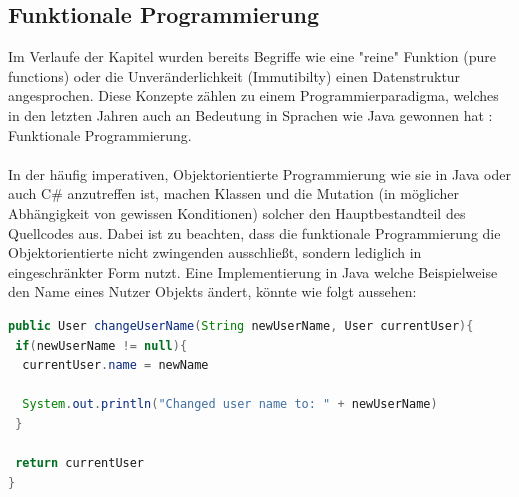 \subsection{Funktionale Programmierung}
Im Verlaufe der Kapitel wurden bereits Begriffe wie eine "reine" Funktion (pure functions) oder die Unveränderlichkeit (Immutibilty) einen Datenstruktur angesprochen. Diese Konzepte zählen zu einem Programmierparadigma, welches in den letzten Jahren auch an Bedeutung in Sprachen wie Java gewonnen hat
\cite{javaFunctionalProgramming}
: Funktionale Programmierung.
\\
\\
In der häufig imperativen, Objektorientierte Programmierung wie sie in Java oder auch C\# anzutreffen ist, machen Klassen und
die Mutation (in möglicher Abhängigkeit von gewissen Konditionen) solcher den Hauptbestandteil des Quellcodes aus. Dabei ist zu beachten, dass die funktionale Programmierung die Objektorientierte nicht zwingenden ausschließt, sondern lediglich in eingeschränkter Form nutzt.
Eine Implementierung in Java welche Beispielweise den Name eines Nutzer Objekts ändert, könnte wie folgt aussehen:
\begin{lstlisting}[frame=single, language=Java]
public User changeUserName(String newUserName, User currentUser){
 if(newUserName != null){
  currentUser.name = newName
		
  System.out.println("Changed user name to: " + newUserName)	
 }
	
 return currentUser
}
\end{lstlisting}
